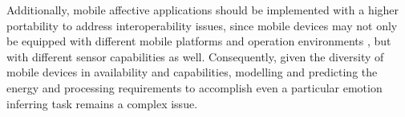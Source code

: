 Additionally, mobile affective applications should be implemented with a higher portability to address interoperability issues, since mobile devices may not only be equipped with different mobile platforms and operation environments \cite{khan2013mobile}, but with different sensor capabilities as well. Consequently, given the diversity of mobile devices in availability and capabilities, modelling and predicting the energy and processing requirements to accomplish even a particular emotion inferring task remains a complex issue.